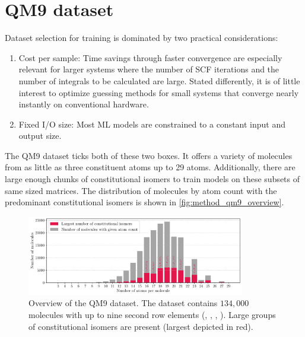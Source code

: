 \section{QM9 dataset}
\label{sec:dataset}
Dataset selection for training is dominated by two practical considerations:
\begin{enumerate}
    \item Cost per sample: Time savings through faster convergence are especially relevant for larger systems where the number of SCF iterations and the number of integrals to be calculated are large. Stated differently, it is of little interest to optimize guessing methods for small systems that converge nearly instantly on conventional hardware. 
    \item Fixed I/O size: Most ML models are constrained to a constant input and output size. 
\end{enumerate}

The QM9 dataset \parencite{ref:data_qm9, ref:article1_qm9,ref:article2_qm9} ticks both of these two boxes. It offers a variety of molecules from as little as three constituent atoms up to 29 atoms. Additionally, there are large enough chunks of constitutional isomers to train models on these subsets of same sized matrices. The distribution of molecules by atom count with the predominant constitutional isomers is shown in \autoref{fig:method_qm9_overview}.
\begin{figure}[H]
    \centering
    \includegraphics[width=0.85\textwidth]{../fig/qm9_general/qm9_overview_stacked_bar.pdf}
    \caption[QM9 dataset overview]{Overview of the QM9 dataset. The dataset contains $134,000$ molecules with up to nine second row elements (, , , ). Large groups of constitutional isomers are present (largest depicted in red).}
    \label{fig:method_qm9_overview}
\end{figure}
